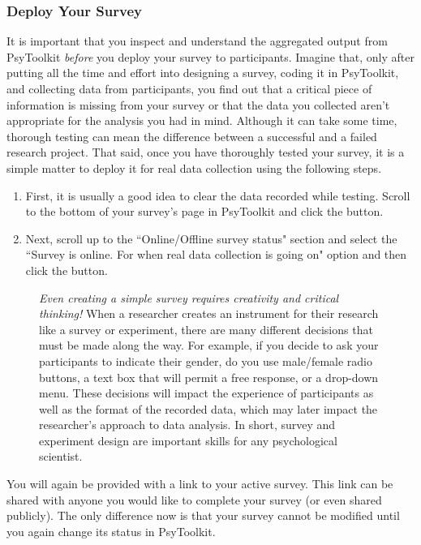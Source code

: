 \subsubsection{Deploy Your Survey}
It is important that you inspect and understand the aggregated output from PsyToolkit \emph{before} you deploy your survey to participants. Imagine that, only after putting all the time and effort into designing a survey, coding it in PsyToolkit, and collecting data from participants, you find out that a critical piece of information is missing from your survey or that the data you collected aren't appropriate for the analysis you had in mind.  Although it can take some time, thorough testing can mean the difference between a successful and a failed research project. That said, once you have thoroughly tested your survey, it is a simple matter to deploy it for real data collection using the following steps.

\begin{enumerate}
    \item First, it is usually a good idea to clear the data recorded while testing. Scroll to the bottom of your survey's page in PsyToolkit and click the  button.
    \item Next, scroll up to the ``Online/Offline survey status" section and select the ``Survey is online. For when real data collection is going on" option and then click the  button.
\end{enumerate} 

\begin{figure}
\begin{tcolorbox}[width=\textwidth,colback=yellow!5!white,colframe=yellow!50!black,
  colbacktitle=yellow!75!black,title=Food For Thought,grow to right by=1cm]
  \emph{Even creating a simple survey requires creativity and critical thinking!}
  \tcblower
  When a researcher creates an instrument for their research like a survey or experiment, there are many different decisions that must be made along the way.  For example, if you decide to ask your participants to indicate their gender, do you use male/female radio buttons, a text box that will permit a free response, or a drop-down menu.  These decisions will impact the experience of participants as well as the format of the recorded data, which may later impact the researcher's approach to data analysis.  In short, survey and experiment design are important skills for any psychological scientist.
\end{tcolorbox}
\end{figure}
You will again be provided with a link to your active survey.  This link can be shared with anyone you would like to complete your survey (or even shared publicly).  The only difference now is that your survey cannot be modified until you again change its status in PsyToolkit.

